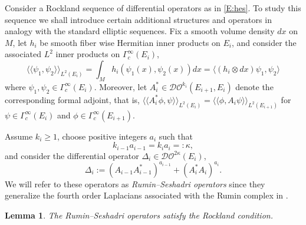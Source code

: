 \documentclass[reqno,12pt]{amsart}
\newcommand\llangle{\langle\!\langle}
\newcommand\rrangle{\rangle\!\rangle}
\newcommand{\DO}{\mathcal D\mathcal O}
\theoremstyle{plain}
\newtheorem{lemma}[theorem]{Lemma}
\theoremstyle{definition}
\begin{document}
Consider a Rockland sequence of differential operators as in \eqref{E:hes}.
To study this sequence we shall introduce certain additional structures and operators in analogy with the standard elliptic sequences.
Fix a smooth volume density $dx$ on $M$, let $h_i$ be smooth fiber wise Hermitian inner products on $E_i$, and consider the associated $L^2$ inner products on $\Gamma^\infty_c(E_i)$,
\begin{equation}\label{E:llrrEi}
\llangle\psi_1,\psi_2\rrangle_{L^2(E_i)}
=\int_Mh_i(\psi_1(x),\psi_2(x))dx
=\langle(h_i\otimes dx)\psi_1,\psi_2\rangle
\end{equation}
where $\psi_1,\psi_2\in\Gamma_c^\infty(E_i)$.
Moreover, let $A_i^*\in\DO^{k_i}(E_{i+1},E_i)$ denote the corresponding formal adjoint, that is, $\llangle A_i^*\phi,\psi\rrangle_{L^2(E_i)}=\llangle\phi,A_i\psi\rrangle_{L^2(E_{i+1})}$ for $\psi\in\Gamma^\infty_c(E_i)$ and $\phi\in\Gamma_c^\infty(E_{i+1})$.


Assume $k_i\geq1$, choose positive integers $a_i$ such that 
\begin{equation}\label{E:RSai}
k_{i-1}a_{i-1}=k_ia_i=:\kappa,
\end{equation}
and consider the differential operator $\Delta_i\in\DO^{2\kappa}(E_i)$,
\begin{equation}\label{E:RSDelta}
\Delta_i:=(A_{i-1}A_{i-1}^*)^{a_{i-1}}+(A_i^*A_i)^{a_i}.
\end{equation}
We will refer to these operators as \emph{Rumin--Seshadri operators} since they generalize the fourth order Laplacians associated with the Rumin complex in \cite[Section~2.3]{RS12}.


\begin{lemma}\label{L:rockseq}
The Rumin--Seshadri operators satisfy the Rockland condition.
\end{lemma}
\end{document}
